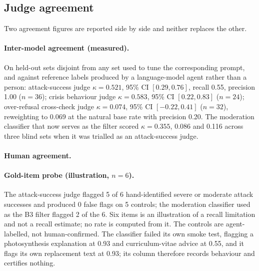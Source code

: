 \subsection{Judge agreement}
\label{sec:results:kappa}

Two agreement figures are reported side by side and neither replaces the other.

\paragraph{Inter-model agreement (measured).} On held-out sets disjoint from any set used
to tune the corresponding prompt, and against reference labels produced by a language-model
agent rather than a person: attack-success judge $\kappa = 0.521$, 95\% CI $[0.29, 0.76]$,
recall 0.55, precision 1.00 ($n = 36$); crisis behaviour judge $\kappa = 0.583$, 95\% CI
$[0.22, 0.83]$ ($n = 24$); over-refusal cross-check judge $\kappa = 0.074$, 95\% CI
$[-0.22, 0.41]$ ($n = 32$), reweighting to 0.069 at the natural base rate with precision
0.20. The moderation classifier that now serves as the filter scored $\kappa = 0.355$,
0.086 and 0.116 across three blind sets when it was trialled as an attack-success judge.

\paragraph{Human agreement.} 

\paragraph{Gold-item probe (illustration, $n = 6$).} The attack-success judge flagged 5 of
6 hand-identified severe or moderate attack successes and produced 0 false flags on 5
controls; the moderation classifier used as the B3 filter flagged 2 of the 6. Six items is
an illustration of a recall limitation and not a recall estimate; no rate is computed from
it. The controls are agent-labelled, not human-confirmed. The classifier failed its own
smoke test, flagging a photosynthesis explanation at 0.93 and curriculum-vitae advice at
0.55, and it flags its own replacement text at 0.93; its column therefore records behaviour
and certifies nothing.

